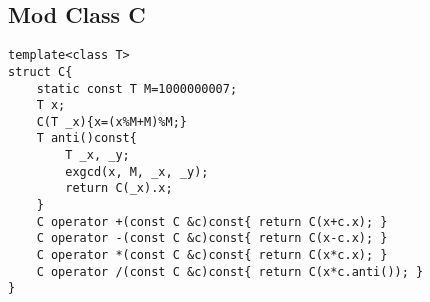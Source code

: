 \subsection{Mod Class C}
\begin{lstlisting}
template<class T>
struct C{
	static const T M=1000000007;
	T x;
	C(T _x){x=(x%M+M)%M;}
	T anti()const{
		T _x, _y;
		exgcd(x, M, _x, _y);
		return C(_x).x; 
	}
	C operator +(const C &c)const{ return C(x+c.x); }
	C operator -(const C &c)const{ return C(x-c.x); }
	C operator *(const C &c)const{ return C(x*c.x); }
	C operator /(const C &c)const{ return C(x*c.anti()); }
}
\end{lstlisting}
